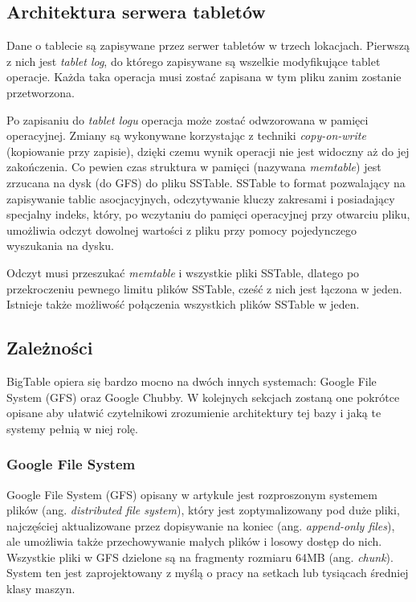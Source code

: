 \subsection*{Architektura serwera tabletów}
\label{sec:bigtable-architektura-serwera-tabletow}


Dane o tablecie są zapisywane przez serwer tabletów w trzech lokacjach.
Pierwszą z nich jest \emph{tablet log}, do którego zapisywane są wszelkie modyfikujące tablet operacje.
Każda taka operacja musi zostać zapisana w tym pliku zanim zostanie przetworzona.

Po zapisaniu do \emph{tablet logu} operacja może zostać odwzorowana w pamięci operacyjnej.
Zmiany są wykonywane korzystając z techniki \emph{copy-on-write} (kopiowanie przy zapisie), dzięki czemu wynik operacji nie jest widoczny aż do jej zakończenia.
Co pewien czas struktura w pamięci (nazywana \emph{memtable}) jest zrzucana na dysk (do GFS) do pliku SSTable.
SSTable to format pozwalający na zapisywanie tablic asocjacyjnych, odczytywanie kluczy zakresami i posiadający specjalny indeks, który, po wczytaniu do pamięci operacyjnej przy otwarciu pliku, umożliwia odczyt dowolnej wartości z pliku przy pomocy pojedynczego wyszukania na dysku.

Odczyt musi przeszukać \emph{memtable} i wszystkie pliki SSTable, dlatego po przekroczeniu pewnego limitu plików SSTable, cześć z nich jest łączona w jeden.
Istnieje także możliwość połączenia wszystkich plików SSTable w jeden.

\subsection*{Zależności}
\label{sec:bigtable-zaleznosci}

BigTable opiera się bardzo mocno na dwóch innych systemach: Google File System (GFS) oraz Google Chubby.
W kolejnych sekcjach zostaną one pokrótce opisane aby ułatwić czytelnikowi zrozumienie architektury tej bazy i jaką te systemy pełnią w niej rolę.

\subsubsection*{Google File System}

Google File System (GFS) opisany w artykule \cite{google-file-system} jest rozproszonym systemem plików (ang. \emph{distributed file system}), który jest zoptymalizowany pod duże pliki, najczęściej aktualizowane przez dopisywanie na koniec (ang. \emph{append-only files}), ale umożliwia także przechowywanie małych plików i losowy dostęp do nich.
Wszystkie pliki w GFS dzielone są na fragmenty rozmiaru 64MB (ang. \emph{chunk}).
System ten jest zaprojektowany z myślą o pracy na setkach lub tysiącach średniej klasy maszyn.

